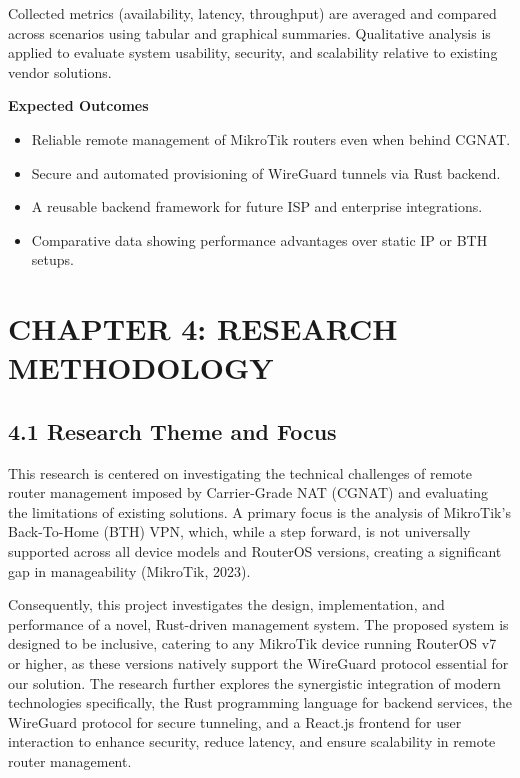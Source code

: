\documentclass[12pt,a4paper,oneside]{report}
\begin{document}
Collected metrics (availability, latency, throughput) are averaged and compared across scenarios using tabular and graphical summaries. Qualitative analysis is applied to evaluate system usability, security, and scalability relative to existing vendor solutions.






\textbf{Expected Outcomes}


\begin{itemize}
  \item Reliable remote management of MikroTik routers even when behind CGNAT.
  \item Secure and automated provisioning of WireGuard tunnels via Rust backend.
  \item A reusable backend framework for future ISP and enterprise integrations.
  \item Comparative data showing performance advantages over static IP or BTH setups.
\end{itemize}

\chapter{CHAPTER 4: RESEARCH METHODOLOGY}

\section{4.1 Research Theme and Focus}

 This research is centered on investigating the technical challenges of remote router management imposed by Carrier-Grade NAT (CGNAT) and evaluating the limitations of existing solutions. A primary focus is the analysis of MikroTik's Back-To-Home (BTH) VPN, which, while a step forward, is not universally supported across all device models and RouterOS versions, creating a significant gap in manageability (MikroTik, 2023).




Consequently, this project investigates the design, implementation, and performance of a novel, Rust-driven management system. The proposed system is designed to be inclusive, catering to any MikroTik device running RouterOS v7 or higher, as these versions natively support the WireGuard protocol essential for our solution. The research further explores the synergistic integration of modern technologies specifically, the Rust programming language for backend services, the WireGuard protocol for secure tunneling, and a React.js frontend for user interaction to enhance security, reduce latency, and ensure scalability in remote router management.
\end{document}
